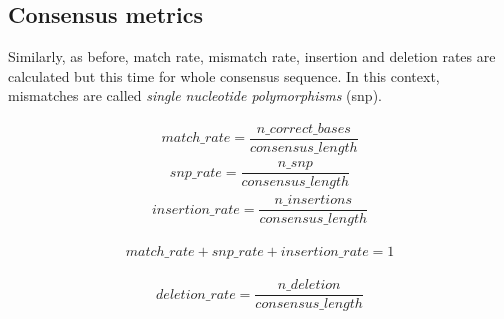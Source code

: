 \documentclass[runningheads,a4paper]{llncs}
\begin{document}
\subsection{Consensus metrics}
\label{app:evaluation:consensus}

Similarly, as before, match rate, mismatch rate, insertion and deletion rates are calculated but this time for whole consensus sequence. In this context, mismatches are called \emph{single nucleotide polymorphisms} (snp).

\begin{equation}
\begin{gathered}
match\_rate = \dfrac{n\_correct\_bases}{consensus\_length}
\end{gathered}
\end{equation}
\begin{equation}
\begin{gathered}
snp\_rate = \dfrac{n\_snp}{consensus\_length}
\end{gathered}
\end{equation}
\begin{equation}
\begin{gathered}
insertion\_rate = \dfrac{n\_insertions}{consensus\_length}
\end{gathered}
\end{equation}

\begin{equation}
\begin{gathered}
match\_rate  + snp\_rate + insertion\_rate = 1
\end{gathered}
\end{equation}


\begin{equation}
\begin{gathered}
deletion\_rate = \dfrac{n\_deletion}{consensus\_length}
\end{gathered}
\end{equation}
\end{document}
